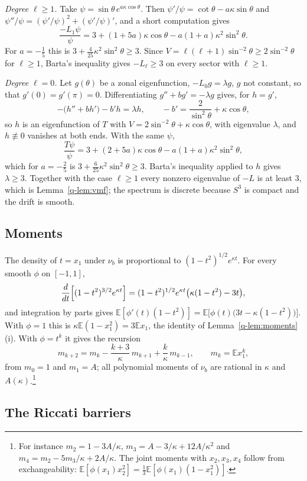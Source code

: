 \documentclass[11pt]{amsart}
\theoremstyle{definition}
\theoremstyle{remark}
\numberwithin{equation}{section}
\newcommand{\E}{\mathbb{E}}
\begin{document}
\emph{Degree $\ell\ge1$.} Take $\psi=\sin\theta\,e^{a\kappa\cos\theta}$. Then
$\psi'/\psi=\cot\theta-a\kappa\sin\theta$ and
$\psi''/\psi=(\psi'/\psi)^2+(\psi'/\psi)'$, and a short computation gives
\[
\frac{-L_1\psi}\psi=3+(1+5a)\kappa\cos\theta-a(1+a)\kappa^2\sin^2\theta .
\]
For $a=-\frac15$ this is $3+\frac4{25}\kappa^2\sin^2\theta\ge3$. Since
$V=\ell(\ell+1)\sin^{-2}\theta\ge2\sin^{-2}\theta$ for $\ell\ge1$, Barta's
inequality gives $-L_\ell\ge3$ on every sector with $\ell\ge1$.

\emph{Degree $\ell=0$.} Let $g(\theta)$ be a zonal eigenfunction,
$-L_0g=\lambda g$, $g$ not constant, so that $g'(0)=g'(\pi)=0$. Differentiating
$g''+bg'=-\lambda g$ gives, for $h=g'$,
\[
-\bigl(h''+bh'\bigr)-b'h=\lambda h,\qquad -b'=\frac2{\sin^2\theta}+\kappa
\cos\theta,
\]
so $h$ is an eigenfunction of $T$ with $V=2\sin^{-2}\theta+\kappa\cos\theta$,
with eigenvalue $\lambda$, and $h\not\equiv0$ vanishes at both ends. With the
same $\psi$,
\[
\frac{T\psi}\psi=3+(2+5a)\kappa\cos\theta-a(1+a)\kappa^2\sin^2\theta,
\]
which for $a=-\frac25$ is $3+\frac6{25}\kappa^2\sin^2\theta\ge3$. Barta's
inequality applied to $h$ gives $\lambda\ge3$. Together with the case
$\ell\ge1$ every nonzero eigenvalue of $-L$ is at least $3$, which is
Lemma~\ref{q-lem:vmf}; the spectrum is discrete because $S^3$ is compact and
the drift is smooth.

\subsection{Moments}

The density of $t=x_1$ under $\nu_b$ is proportional to $(1-t^2)^{1/2}e^{
\kappa t}$. For every smooth $\phi$ on $[-1,1]$,
\[
\frac d{dt}\Bigl[(1-t^2)^{3/2}e^{\kappa t}\Bigr]=(1-t^2)^{1/2}e^{\kappa t}
\bigl(\kappa(1-t^2)-3t\bigr),
\]
and integration by parts gives $\E[\phi'(t)(1-t^2)]=\E\bigl[\phi(t)\bigl(3t-
\kappa(1-t^2)\bigr)\bigr]$. With $\phi=1$ this is $\kappa\E(1-x_1^2)=3\E x_1$,
the identity of Lemma~\ref{q-lem:moments}(i). With $\phi=t^k$ it gives the
recursion
\[
m_{k+2}=m_k-\frac{k+3}\kappa\,m_{k+1}+\frac k\kappa\,m_{k-1},\qquad m_k=\E
x_1^k,
\]
from $m_0=1$ and $m_1=A$; all polynomial moments of $\nu_b$ are rational in
$\kappa$ and $A(\kappa)$.\footnote{For instance $m_2=1-3A/\kappa$,
$m_3=A-3/\kappa+12A/\kappa^2$ and $m_4=m_2-5m_3/\kappa+2A/\kappa$. The joint moments
with $x_2,x_3,x_4$ follow from exchangeability:
$\E[\phi(x_1)x_2^2]=\frac13\E[\phi(x_1)(1-x_1^2)]$.}

\subsection{The Riccati barriers}
\end{document}
